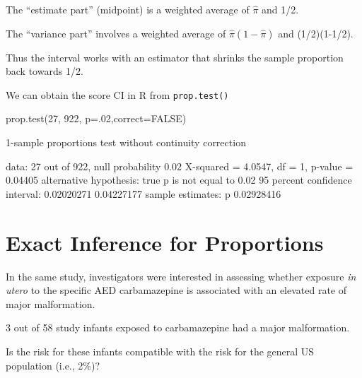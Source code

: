 \documentclass[
  letterpaper,
  DIV=11,
  numbers=noendperiod]{scrreport}
\newenvironment{Shaded}{\begin{snugshade}}{\end{snugshade}}
\newcommand{\AttributeTok}[1]{\textcolor[rgb]{0.40,0.45,0.13}{#1}}
\newcommand{\ConstantTok}[1]{\textcolor[rgb]{0.56,0.35,0.01}{#1}}
\newcommand{\DecValTok}[1]{\textcolor[rgb]{0.68,0.00,0.00}{#1}}
\newcommand{\FloatTok}[1]{\textcolor[rgb]{0.68,0.00,0.00}{#1}}
\newcommand{\FunctionTok}[1]{\textcolor[rgb]{0.28,0.35,0.67}{#1}}
\newcommand{\NormalTok}[1]{\textcolor[rgb]{0.00,0.23,0.31}{#1}}
\newcommand{\OtherTok}[1]{\textcolor[rgb]{0.00,0.23,0.31}{#1}}
\newcommand{\SpecialCharTok}[1]{\textcolor[rgb]{0.37,0.37,0.37}{#1}}
\begin{document}
The ``estimate part'' (midpoint) is a weighted average of \(\hat \pi\)
and 1/2.

The ``variance part'' involves a weighted average of
\(\hat \pi (1-\hat \pi)\) and (1/2)(1-1/2).

Thus the interval works with an estimator that shrinks the sample
proportion back towards 1/2.

We can obtain the score CI in R from \texttt{prop.test()}

\begin{Shaded}
\begin{Highlighting}[]
\FunctionTok{prop.test}\NormalTok{(}\DecValTok{27}\NormalTok{, }\DecValTok{922}\NormalTok{, }\AttributeTok{p=}\NormalTok{.}\DecValTok{02}\NormalTok{,}\AttributeTok{correct=}\ConstantTok{FALSE}\NormalTok{)}

    \DecValTok{1}\SpecialCharTok{{-}}\NormalTok{sample proportions test without continuity correction}

\NormalTok{data}\SpecialCharTok{:} \DecValTok{27}\NormalTok{ out of }\DecValTok{922}\NormalTok{, null probability }\FloatTok{0.02}
\NormalTok{X}\SpecialCharTok{{-}}\NormalTok{squared }\OtherTok{=} \FloatTok{4.0547}\NormalTok{, df }\OtherTok{=} \DecValTok{1}\NormalTok{, p}\SpecialCharTok{{-}}\NormalTok{value }\OtherTok{=} \FloatTok{0.04405}
\NormalTok{alternative hypothesis}\SpecialCharTok{:}\NormalTok{ true p is not equal to }\FloatTok{0.02}
\DecValTok{95}\NormalTok{ percent confidence interval}\SpecialCharTok{:}
\FloatTok{0.02020271} \FloatTok{0.04227177}
\NormalTok{sample estimates}\SpecialCharTok{:}
\NormalTok{         p}
\FloatTok{0.02928416}
\end{Highlighting}
\end{Shaded}

\hypertarget{exact-inference-for-proportions}{%
\section{Exact Inference for
Proportions}\label{exact-inference-for-proportions}}

In the same study, investigators were interested in assessing whether
exposure \emph{in utero} to the specific AED carbamazepine is associated
with an elevated rate of major malformation.

3 out of 58 study infants exposed to carbamazepine had a major
malformation.

Is the risk for these infants compatible with the risk for the general
US population (i.e., 2\%)?
\end{document}
